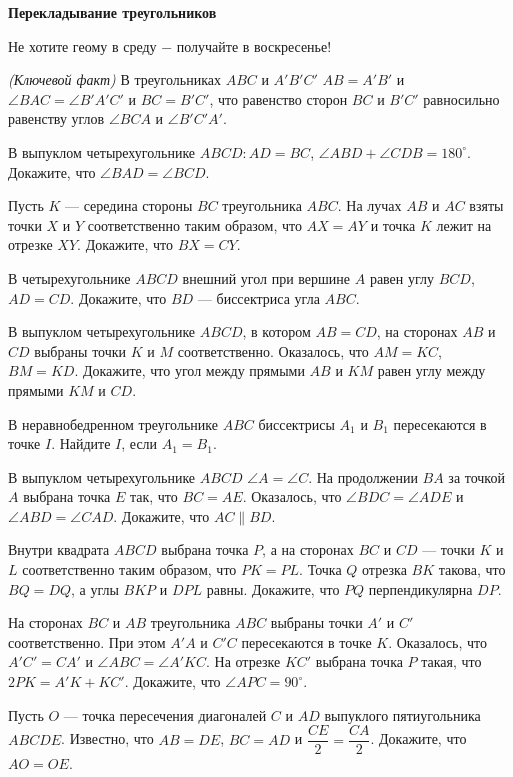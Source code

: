 \centerline{\Huge \bf Перекладывание треугольников}

\begin{flushright}
    \scriptsize{Не хотите геому в среду $-$ получайте в воскресенье!}
\end{flushright}

 \textit{(Ключевой факт)} В треугольниках $ABC$ и $A'B'C'$ $AB = A'B'$ и $\angle BAC = \angle B'A'C'$ и $BC = B'C'$, что равенство сторон $BC$ и $B'C'$ равносильно равенству углов $\angle BCA$ и $\angle B'C'A'$.

 В выпуклом четырехугольнике $ABCD: AD = BC$, $\angle ABD + \angle CDB = 180^\circ$. Докажите, что $\angle BAD = \angle BCD$.

 Пусть $K$ — середина стороны $BC$ треугольника $ABC$. На лучах $AB$ и $AC$ взяты точки $X$ и $Y$ соответственно таким образом, что $AX = AY$ и точка $K$ лежит на отрезке $XY$. Докажите, что $BX = CY$.

 В четырехугольнике $ABCD$ внешний угол при вершине $A$ равен углу $BCD$, $AD = CD$. Докажите, что $BD$ — биссектриса угла $ABC$.

 В выпуклом четырехугольнике $ABCD$, в котором $AB = CD$, на сторонах $AB$ и $CD$ выбраны точки $K$ и $M$ соответственно. Оказалось, что $AM = KC$, $BM = KD$. Докажите, что угол между прямыми $AB$ и $KM$ равен углу между прямыми $KM$ и $CD$.

 В неравнобедренном треугольнике $ABC$ биссектрисы $A_1$ и $B_1$ пересекаются в точке $I$. Найдите $I$, если $A_1 = B_1$.

 В выпуклом четырехугольнике $ABCD$ $\angle A = \angle C$. На продолжении $BA$ за точкой $A$ выбрана точка $E$ так, что $BC = AE$. Оказалось, что $\angle BDC = \angle ADE$ и $\angle ABD = \angle CAD$. Докажите, что $AC \parallel BD$.

 Внутри квадрата $ABCD$ выбрана точка $P$, а на сторонах $BC$ и $CD$ — точки $K$ и $L$ соответственно таким образом, что $PK = PL$. Точка $Q$ отрезка $BK$ такова, что $BQ = DQ$, а углы $BKP$ и $DPL$ равны. Докажите, что $PQ$ перпендикулярна $DP$.

 На сторонах $BC$ и $AB$ треугольника $ABC$ выбраны точки $A'$ и $C'$ соответственно. При этом $A'A$ и $C'C$ пересекаются в точке $K$. Оказалось, что $A'C' = CA'$ и $\angle ABC = \angle A'KC$. На отрезке $KC'$ выбрана точка $P$ такая, что $2PK = A'K + KC'$. Докажите, что $\angle APC = 90^\circ$.

 Пусть $O$ — точка пересечения диагоналей $C$ и $AD$ выпуклого пятиугольника $ABCDE$. Известно, что $AB = DE$, $BC = AD$ и $\dfrac{CE}{2} = \dfrac{CA}{2}$. Докажите, что $AO = OE$.

